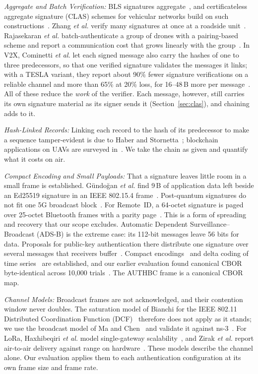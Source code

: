 \documentclass[lineno,pdflatex,sn-mathphys-num]{sn-jnl}
\newcommand{\runin}[1]{\textit{#1:}}
\renewcommand{\_}{\authbcunderscore\allowbreak}
\begin{document}
\runin{Aggregate and Batch Verification} BLS signatures aggregate~\cite{bls2001,bgls2003}, and
certificateless aggregate signature (CLAS) schemes for vehicular networks build on such
constructions~\cite{li2025clas}. Zhang \emph{et al.} verify many signatures at once at a roadside
unit~\cite{zhang2008batch}. Rajasekaran \emph{et al.} batch-authenticate a group of drones with a
pairing-based scheme and report a communication cost that grows linearly with the
group~\cite{rajasekaran2022batchfanet}. In V2X, Cominetti \emph{et al.} let each signed message
also carry the hashes of one to three predecessors, so that one verified signature validates the
messages it links; with a TESLA variant, they report about 90\% fewer signature verifications on
a reliable channel and more than 65\% at 20\% loss, for 16--48\,B more per
message~\cite{cominetti2022chaining}. All of these reduce the \emph{work} of the verifier.
Each message, however, still carries its own signature material as its signer sends it
(Section~\ref{sec:clas}), and chaining adds to it.

\runin{Hash-Linked Records} Linking each record to the hash of its predecessor to make a
sequence tamper-evident is due to Haber and Stornetta~\cite{haber1991timestamp}; blockchain
applications on UAVs are surveyed in~\cite{mehta2020blockchainuav}. We take the chain as given
and quantify what it costs on air.

\runin{Compact Encoding and Small Payloads} That a signature leaves little room in a small frame
is established. G{\"u}ndo{\u{g}}an \emph{et al.} find 9\,B of application data left beside an
Ed25519 signature in an IEEE 802.15.4 frame~\cite{gundogan2021firmware}. Post-quantum signatures
do not fit one 5G broadcast block~\cite{arxiv2510pqsib1}. For Remote~ID, a 64-octet signature is
paged over 25-octet Bluetooth frames with a parity page~\cite{rfc9575}. This is a form of
spreading and recovery that our scope excludes. Automatic Dependent Surveillance--Broadcast
(ADS-B) is the extreme case: its 112-bit messages leave 56 bits for data. Proposals for
public-key authentication there distribute one signature over several messages that receivers
buffer~\cite{strohmeier2015adsb}. Compact encodings~\cite{rfc8949} and delta coding of time
series~\cite{pelkonen2015gorilla} are established, and our earlier evaluation found canonical
CBOR byte-identical across 10,000 trials~\cite{farouk2026encoding}. The AUTHBC frame is a
canonical CBOR map.

\runin{Channel Models} Broadcast frames are not acknowledged, and their contention window never
doubles. The saturation model of Bianchi for the IEEE 802.11 Distributed Coordination Function
(DCF)~\cite{bianchi2000} therefore does not apply as it stands; we use the broadcast model of Ma
and Chen~\cite{machen2007,machen2008} and validate it against ns-3~\cite{nsnam}. For LoRa,
Haxhibeqiri \emph{et al.} model single-gateway scalability~\cite{haxhibeqiri2017lora}, and Zirak
\emph{et al.} report air-to-air delivery against range on hardware~\cite{zirak2021swarm}. These
models describe the channel alone. Our evaluation applies them to each authentication
configuration at its own frame size and frame rate.
\end{document}
